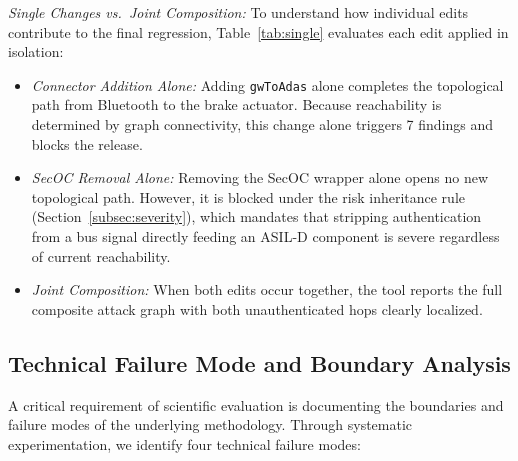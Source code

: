 \documentclass[journal]{IEEEtran}
\begin{document}
\emph{Single Changes vs.\ Joint Composition:} To understand how individual edits contribute to the final regression, Table~\ref{tab:single} evaluates each edit applied in isolation:
\begin{itemize}
\item \emph{Connector Addition Alone:} Adding \texttt{gwToAdas} alone completes the topological path from Bluetooth to the brake actuator. Because reachability is determined by graph connectivity, this change alone triggers 7 findings and blocks the release.
\item \emph{SecOC Removal Alone:} Removing the SecOC wrapper alone opens no new topological path. However, it is blocked under the risk inheritance rule (Section~\ref{subsec:severity}), which mandates that stripping authentication from a bus signal directly feeding an ASIL-D component is severe regardless of current reachability.
\item \emph{Joint Composition:} When both edits occur together, the tool reports the full composite attack graph with both unauthenticated hops clearly localized.
\end{itemize}

\subsection{Technical Failure Mode and Boundary Analysis}
\label{subsec:failure_modes}

A critical requirement of scientific evaluation is documenting the boundaries and failure modes of the underlying methodology. Through systematic experimentation, we identify four technical failure modes:
\end{document}
